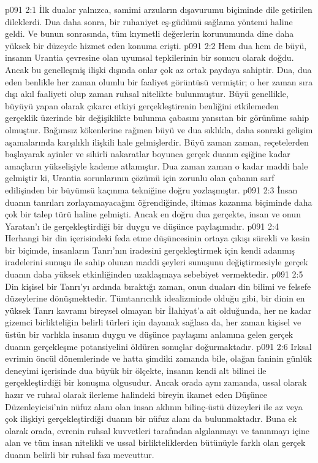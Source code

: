 \vs p091 2:1 İlk dualar yalnızca, samimi arzuların dışavurumu biçiminde dile getirilen dileklerdi. Dua daha sonra, bir ruhaniyet eş\hyp{}güdümü sağlama yöntemi haline geldi. Ve bunun sonrasında, tüm kıymetli değerlerin korunumunda dine daha yüksek bir düzeyde hizmet eden konuma erişti.
\vs p091 2:2 Hem dua hem de büyü, insanın Urantia çevresine olan uyumsal tepkilerinin bir sonucu olarak doğdu. Ancak bu genelleşmiş ilişki dışında onlar çok az ortak paydaya sahiptir. Dua, dua eden benlikle her zaman olumlu bir faaliyet görüntüsü vermiştir; o her zaman sıra dışı akıl faaliyeti olup zaman ruhsal nitelikte bulunmuştur. Büyü genellikle, büyüyü yapan olarak çıkarcı etkiyi gerçekleştirenin benliğini etkilemeden gerçeklik üzerinde bir değişiklikte bulunma çabasını yansıtan bir görünüme sahip olmuştur. Bağımsız kökenlerine rağmen büyü ve dua sıklıkla, daha sonraki gelişim aşamalarında karşılıklı ilişkili hale gelmişlerdir. Büyü zaman zaman, reçetelerden başlayarak ayinler ve sihirli nakaratlar boyunca gerçek duanın eşiğine kadar amaçların yükselişiyle kademe atlamıştır. Dua zaman zaman o kadar maddi hale gelmiştir ki, Urantia sorunlarının çözümü için zorunlu olan çabanın sarf edilişinden bir büyümsü kaçınma tekniğine doğru yozlaşmıştır.
\vs p091 2:3 İnsan duanın tanrıları zorlayamayacağını öğrendiğinde, iltimas kazanma biçiminde daha çok bir talep türü haline gelmişti. Ancak en doğru dua gerçekte, insan ve onun Yaratan’ı ile gerçekleştirdiği bir duygu ve düşünce paylaşımıdır.
\vs p091 2:4 Herhangi bir din içerisindeki feda etme düşüncesinin ortaya çıkışı sürekli ve kesin bir biçimde, insanların Tanrı’nın iradesini gerçekleştirmek için kendi adanmış iradelerini sunuşu ile sahip olunan maddi şeyleri sunuşunu değiştirmesiyle gerçek duanın daha yüksek etkinliğinden uzaklaşmaya sebebiyet vermektedir.
\vs p091 2:5 Din kişisel bir Tanrı’yı ardında bıraktığı zaman, onun duaları din bilimi ve felsefe düzeylerine dönüşmektedir. Tümtanrıcılık idealizminde olduğu gibi, bir dinin en yüksek Tanrı kavramı bireysel olmayan bir İlahiyat’a ait olduğunda, her ne kadar gizemci birlikteliğin belirli türleri için dayanak sağlasa da, her zaman kişisel ve üstün bir varlıkla insanın duygu ve düşünce paylaşımı anlamına gelen gerçek duanın gerçekleşme potansiyelini öldüren sonuçlar doğurmaktadır.
\vs p091 2:6 Irksal evrimin öncül dönemlerinde ve hatta şimdiki zamanda bile, olağan faninin günlük deneyimi içerisinde dua büyük bir ölçekte, insanın kendi alt bilinci ile gerçekleştirdiği bir konuşma olgusudur. Ancak orada aynı zamanda, ussal olarak hazır ve ruhsal olarak ilerleme halindeki bireyin ikamet eden Düşünce Düzenleyicisi’nin nüfuz alanı olan insan aklının bilinç\hyp{}üstü düzeyleri ile az veya çok ilişkiyi gerçekleştirdiği duanın bir nüfuz alanı da bulunmaktadır. Buna ek olarak orada, evrenin ruhsal kuvvetleri tarafından algılanmayı ve tanınmayı içine alan ve tüm insan nitelikli ve ussal birlikteliklerden bütünüyle farklı olan gerçek duanın belirli bir ruhsal fazı mevcuttur.
